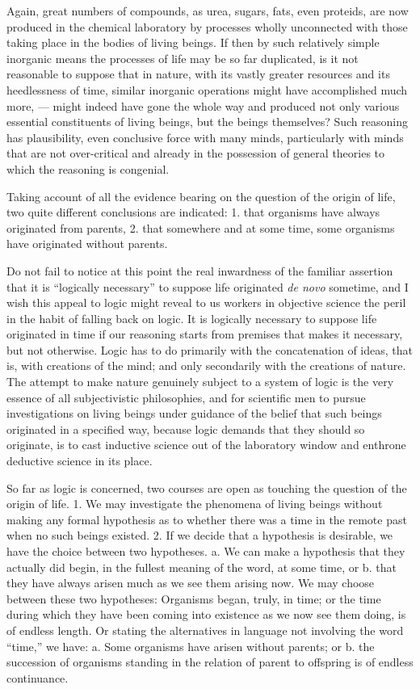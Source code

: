 \documentclass[a4paper, 11pt, oneside, polutonikogreek, english]{article}
\begin{document}
Again, great numbers of compounds, as urea, sugars, fats, even proteids, are now produced in the chemical laboratory by processes wholly unconnected with those taking place in the bodies of living beings. If then by such relatively simple inorganic means the processes of life may be so far duplicated, is it not reasonable to suppose that in nature, with its vastly greater resources and its heedlessness of time, similar inorganic operations might have accomplished much more, --- might indeed have gone the whole way and produced not only various essential constituents of living beings, but the beings themselves? Such reasoning has plausibility, even conclusive force with many minds, particularly with minds that are not over-critical and already in the possession of general theories to which the reasoning is congenial.

Taking account of all the evidence bearing on the question of the origin of life, two quite different conclusions are indicated: 1. that organisms have always originated from parents, 2. that somewhere and at some time, some organisms have originated without parents.

Do not fail to notice at this point the real inwardness of the familiar assertion that it is ``logically necessary'' to suppose life originated \emph{de novo} sometime, and I wish this appeal to logic might reveal to us workers in objective science the peril in the habit of falling back on logic. It is logically necessary to suppose life originated in time if our reasoning starts from premises that makes it necessary, but not otherwise. Logic has to do primarily with the concatenation of ideas, that is, with creations of the mind; and only secondarily with the creations of nature. The attempt to make nature genuinely subject to a system of logic is the very essence of all subjectivistic philosophies, and for scientific men to pursue investigations on living beings under guidance of the belief that such beings originated in a specified way, because logic demands that they should so originate, is to cast inductive science out of the laboratory window and enthrone deductive science in its place.

So far as logic is concerned, two courses are open as touching the question of the origin of life. 1. We may investigate the phenomena of living beings without making any formal hypothesis as to whether there was a time in the remote past when no such beings existed. 2. If we decide that a hypothesis is desirable, we have the choice between two hypotheses. a. We can make a hypothesis that they actually did begin, in the fullest meaning of the word, at some time, or b. that they have always arisen much as we see them arising now. We may choose between these two hypotheses: Organisms began, truly, in time; or the time during which they have been coming into existence as we now see them doing, is of endless length. Or stating the alternatives in language not involving the word ``time,'' we have: a. Some organisms have arisen without parents; or b. the succession of organisms standing in the relation of parent to offspring is of endless continuance.
\end{document}
